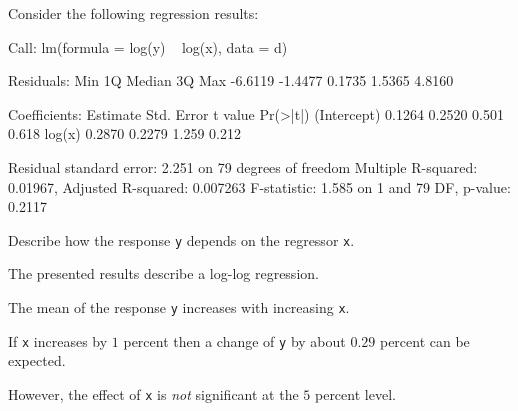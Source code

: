 
\begin{question}
Consider the following regression results:

\begin{Schunk}
\begin{Soutput}
Call:
lm(formula = log(y) ~ log(x), data = d)

Residuals:
    Min      1Q  Median      3Q     Max 
-6.6119 -1.4477  0.1735  1.5365  4.8160 

Coefficients:
            Estimate Std. Error t value Pr(>|t|)
(Intercept)   0.1264     0.2520   0.501    0.618
log(x)        0.2870     0.2279   1.259    0.212

Residual standard error: 2.251 on 79 degrees of freedom
Multiple R-squared:  0.01967,	Adjusted R-squared:  0.007263 
F-statistic: 1.585 on 1 and 79 DF,  p-value: 0.2117
\end{Soutput}
\end{Schunk}

Describe how the response \texttt{y} depends on the regressor \texttt{x}.
\end{question}

\begin{solution}
The presented results describe a log-log regression.

The mean of the response \texttt{y} increases with increasing \texttt{x}.

If \texttt{x} increases by $1$ percent then a change of \texttt{y} by about $0.29$ percent can be expected.

However, the effect of \texttt{x} is \emph{not} significant at the $5$ percent level.
\end{solution}



